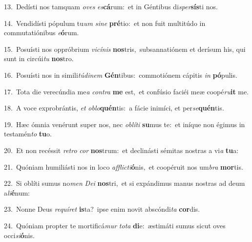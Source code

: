 {\numbfont\textcolor{\numbcolor}{13.}}~Dedísti nos tamquam \textit{o}\-\textit{ves} \textit{es}\-\textbf{cá}rum:~\star et in Géntibus di\-\textit{sper}\-\textbf{sís}ti nos.\par
{\numbfont\textcolor{\numbcolor}{14.}}~Vendidísti pópulum tu\textit{um} \textit{si}\-\textit{ne} \textbf{pré}\-tio:~\star et non fuit multitúdo in commutatiónibus \textit{e}\-\textbf{ó}rum.\par
{\numbfont\textcolor{\numbcolor}{15.}}~Posuísti nos oppróbrium \textit{vi}\-\textit{cí}\textit{nis} \textbf{nos}\-tris,~\star subsannatiónem et derísum his, qui sunt in circúi\textit{tu} \textbf{nos}\-tro.\par
{\numbfont\textcolor{\numbcolor}{16.}}~Posuísti nos in simili\-\textit{tú}\-\textit{di}\textit{nem} \textbf{Gén}\-tibus:~\star commotiónem cápitis \textit{in} \textbf{pó}\-pulis.\par
{\numbfont\textcolor{\numbcolor}{17.}}~Tota die verecúndia me\textit{a} \textit{con}\-\textit{tra} \textbf{me} est,~\star et confúsio faciéi meæ coopé\-\textit{ru}\-\textbf{it} me.\par
{\numbfont\textcolor{\numbcolor}{18.}}~A voce exprobrántis, \textit{et} \textit{ob}\-\textit{lo}\textbf{quén}tis:~\star a fácie inimíci, et per\-\textit{se}\-\textbf{quén}tis.\par
{\numbfont\textcolor{\numbcolor}{19.}}~Hæc ómnia venérunt super nos, nec \textit{ob}\-\textit{lí}\textit{ti} \textbf{su}\-mus te:~\star et iníque non égimus in testamén\textit{to} \textbf{tu}\-o.\par
{\numbfont\textcolor{\numbcolor}{20.}}~Et non recéssit \textit{re}\-\textit{tro} \textit{cor} \textbf{nos}\-trum:~\star et declinásti sémitas nostras a vi\textit{a} \textbf{tu}\-a:\par
{\numbfont\textcolor{\numbcolor}{21.}}~Quóniam humiliásti nos in loco \textit{af}\-\textit{flic}\textit{ti}\textbf{ó}nis,~\star et coopéruit nos um\textit{bra} \textbf{mor}\-tis.\par
{\numbfont\textcolor{\numbcolor}{22.}}~Si oblíti sumus no\textit{men} \textit{De}\-\textit{i} \textbf{nos}\-tri,~\star et si expándimus manus nostras ad deum a\-\textit{li}\-\textbf{é}num:\par
{\numbfont\textcolor{\numbcolor}{23.}}~Nonne Deus \textit{re}\-\textit{quí}\textit{ret} \textbf{is}\-ta?~\star ipse enim novit abscóndi\textit{ta} \textbf{cor}\-dis.\par
{\numbfont\textcolor{\numbcolor}{24.}}~Quóniam propter te mortificá\textit{mur} \textit{to}\-\textit{ta} \textbf{di}\-e:~\star æstimáti sumus sicut oves occi\-\textit{si}\-\textbf{ó}nis.\par
